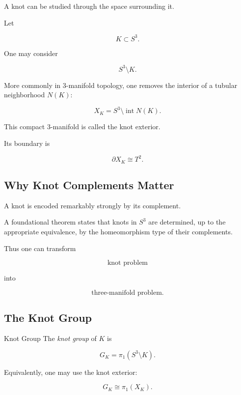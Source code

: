 A knot can be studied through the space surrounding it.

Let

\[
K\subset S^3.
\]

One may consider

\[
S^3\setminus K.
\]

More commonly in \(3\)-manifold topology, one removes the interior of a
tubular neighborhood \(N(K)\):

\[
\boxed{
X_K
=
S^3\setminus\operatorname{int}N(K).
}
\]

This compact \(3\)-manifold is called the knot exterior.

Its boundary is

\[
\boxed{
\partial X_K\cong T^2.
}
\]

\subsection{Why Knot Complements Matter}
\label{subsec:why-knot-complements}

A knot is encoded remarkably strongly by its complement.

A foundational theorem states that knots in \(S^3\) are determined, up to
the appropriate equivalence, by the homeomorphism type of their complements.

Thus one can transform

\[
\boxed{
\text{knot problem}
}
\]

into

\[
\boxed{
\text{three-manifold problem}.
}
\]

\subsection{The Knot Group}
\label{subsec:knot-group}

\begin{definitionbox}{Knot Group}
The \emph{knot group} of \(K\) is

\[
\boxed{
G_K
=
\pi_1(S^3\setminus K).
}
\]
\end{definitionbox}

Equivalently, one may use the knot exterior:

\[
\boxed{
G_K
\cong
\pi_1(X_K).
}
\]


